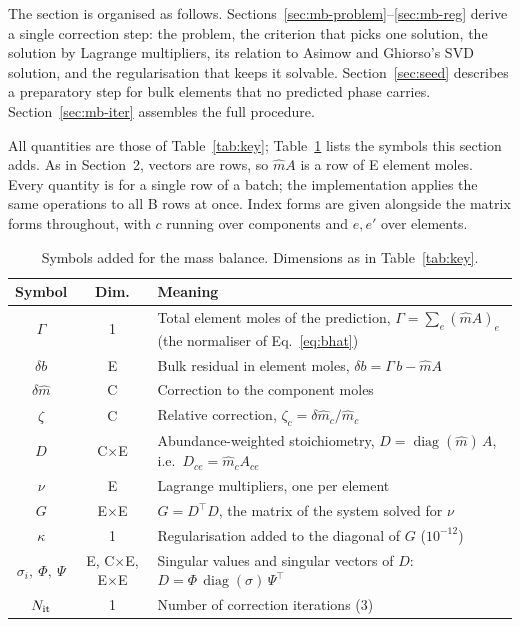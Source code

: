 \documentclass[11pt]{article}
\begin{document}
The section is organised as follows.
Sections~\ref{sec:mb-problem}--\ref{sec:mb-reg} derive a single correction step: the
problem, the criterion that picks one solution, the solution by Lagrange multipliers, its
relation to Asimow and Ghiorso's SVD solution, and the regularisation that keeps it
solvable. Section~\ref{sec:seed} describes a preparatory step for bulk elements that no
predicted phase carries. Section~\ref{sec:mb-iter} assembles the full procedure.

All quantities are those of Table~\ref{tab:key}; Table~\ref{tab:mbkey} lists the symbols
this section adds. As in Section~2, vectors are rows, so $\hat m A$ is a row of E element
moles. Every quantity is for a single row of a batch; the implementation applies the same
operations to all B rows at once. Index forms are given alongside the matrix forms
throughout, with $c$ running over components and $e, e'$ over elements.

\begin{table}[!htb]
\centering
\small
\renewcommand{\arraystretch}{1.25}
\begin{tabular}{@{}c c >{\raggedright\arraybackslash}p{11.6cm}@{}}
\toprule
Symbol & Dim. & Meaning \\
\midrule
$\Gamma$ & 1 & Total element moles of the prediction, $\Gamma = \sum_e (\hat m A)_e$ (the
  normaliser of Eq.~\ref{eq:bhat}) \\
$\delta b$ & E & Bulk residual in element moles, $\delta b = \Gamma\, b - \hat m A$ \\
$\delta \hat m$ & C & Correction to the component moles \\
$\zeta$ & C & Relative correction, $\zeta_c = \delta\hat m_c / \hat m_c$ \\
$D$ & C$\times$E & Abundance-weighted stoichiometry, $D = \operatorname{diag}(\hat m)\, A$,
  i.e.\ $D_{ce} = \hat m_c A_{ce}$ \\
$\nu$ & E & Lagrange multipliers, one per element \\
$G$ & E$\times$E & $G = D^{\!\top} D$, the matrix of the system solved for $\nu$ \\
$\kappa$ & 1 & Regularisation added to the diagonal of $G$ ($10^{-12}$) \\
$\sigma_i,\ \Phi,\ \Psi$ & E, C$\times$E, E$\times$E & Singular values and singular vectors
  of $D$: $D = \Phi\, \operatorname{diag}(\sigma)\, \Psi^{\!\top}$ \\
$N_{\rm it}$ & 1 & Number of correction iterations (3) \\
\bottomrule
\end{tabular}
\caption{Symbols added for the mass balance. Dimensions as in Table~\ref{tab:key}.}
\label{tab:mbkey}
\end{table}
\end{document}
